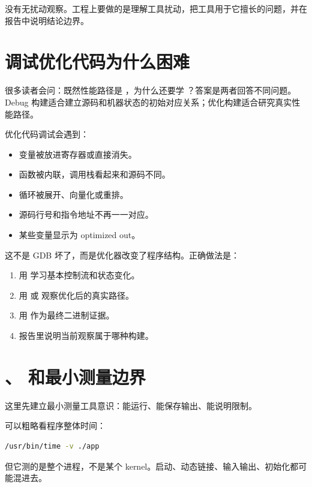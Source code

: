 \begin{keyidea}
没有无扰动观察。工程上要做的是理解工具扰动，把工具用于它擅长的问题，并在报告中说明结论边界。
\end{keyidea}

\section{调试优化代码为什么困难}

很多读者会问：既然性能路径是 ，为什么还要学 ？答案是两者回答不同问题。Debug 构建适合建立源码和机器状态的初始对应关系；优化构建适合研究真实性能路径。

优化代码调试会遇到：

\begin{itemize}
  \item 变量被放进寄存器或直接消失。
  \item 函数被内联，调用栈看起来和源码不同。
  \item 循环被展开、向量化或重排。
  \item 源码行号和指令地址不再一一对应。
  \item 某些变量显示为 optimized out。
\end{itemize}

这不是 GDB 坏了，而是优化器改变了程序结构。正确做法是：

\begin{enumerate}
  \item 用  学习基本控制流和状态变化。
  \item 用  或  观察优化后的真实路径。
  \item 用  作为最终二进制证据。
  \item 报告里说明当前观察属于哪种构建。
\end{enumerate}

\section{、 和最小测量边界}

这里先建立最小测量工具意识：能运行、能保存输出、能说明限制。

 可以粗略看程序整体时间：

\begin{lstlisting}[language=bash]
/usr/bin/time -v ./app
\end{lstlisting}

但它测的是整个进程，不是某个 kernel。启动、动态链接、输入输出、初始化都可能混进去。

